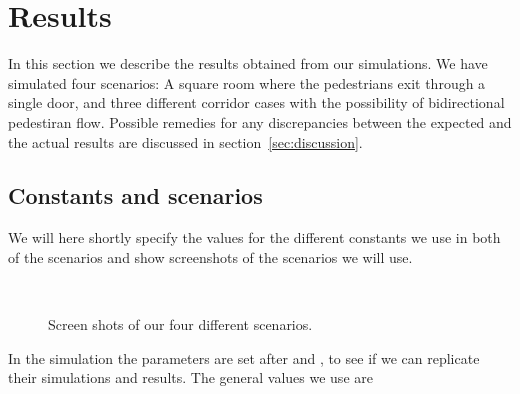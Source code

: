\section{Results}
\label{sec:results}
In this section we describe the results obtained from our simulations.
We have simulated four scenarios: A square room where the pedestrians
exit through a single door, and three different corridor cases with
the possibility of bidirectional pedestiran flow. Possible remedies
for any discrepancies between the expected and the actual results are
discussed in section~\ref{sec:discussion}.

\subsection{Constants and scenarios}
We will here shortly specify the values for the different constants
we use in both of the scenarios and show screenshots of the scenarios
we will use.

\begin{figure}[h]
\centering
{}
\subfloat[Bottleneck.]{\resizebox{7cm}{!}{}}\\
\subfloat[Corridor.]{\resizebox{7cm}{!}{}}
\caption{Screen shots of our four different scenarios.}
\label{fig:fourcases}
\end{figure}

In the simulation the parameters are set after \cite{ABconstant} and
\cite{self-org}, to see if we can replicate their simulations and results.
The general values we use are

